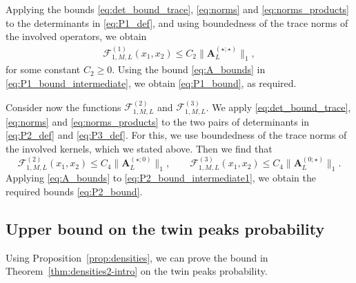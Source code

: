 \documentclass[oneside,final,11pt]{amsart}
\theoremstyle{definition}
\newcommand{\fh}{\mathfrak{h}}
\newcommand{\dens}{\CF}
\newcommand{\1}[1]{\mathbf{1}_{#1}}
\newcommand{\fx}{x}
\newcommand{\fM}{M}
\newcommand{\fA}{\mathbf{A}}
\newcommand{\CF}{\mathcal{F}}
\numberwithin{equation}{section}
\begin{document}
Applying the bounds \eqref{eq:det_bound_trace}, \eqref{eq:norms} and  \eqref{eq:norms_products} to the determinants in \eqref{eq:P1_def}, and using boundedness of the trace norms of the involved operators, we obtain
\begin{align}\label{eq:P1_bound_intermediate}
\dens^{(1)}_{1, \fM, L}(\fx_1, \fx_2) \leq C_2 \bigl\| \fA_L^{(\star; \star)} \bigr\|_1,
\end{align}
for some constant $C_2 \geq 0$. Using the bound \eqref{eq:A_bounds} in \eqref{eq:P1_bound_intermediate}, we obtain \eqref{eq:P1_bound}, as required. 

Consider now the functions $\dens^{(2)}_{1, \fM, L}$ and $\dens^{(3)}_{1, \fM, L}$.  We apply \eqref{eq:det_bound_trace}, \eqref{eq:norms} and \eqref{eq:norms_products} to the two pairs of determinants in \eqref{eq:P2_def} and \eqref{eq:P3_def}. For this, we use boundedness of the trace norms of the involved kernels, which we stated above. Then we find that
\begin{equation}\label{eq:P2_bound_intermediate1}
\dens^{(2)}_{1, \fM, L}(\fx_1, \fx_2) \leq C_4 \bigl\| \fA^{(\star; 0)}_L \bigr\|_1, \qquad \dens^{(3)}_{1, \fM, L}(\fx_1, \fx_2) \leq C_4 \bigl\| \fA^{(0; \star)}_L \bigr\|_1.
\end{equation}
Applying \eqref{eq:A_bounds} to \eqref{eq:P2_bound_intermediate1}, we obtain the required bounds \eqref{eq:P2_bound}.

\subsection{Upper bound on the twin peaks probability}\label{sec:uppbd}

Using Proposition~\ref{prop:densities}, we can prove the bound in Theorem~\ref{thm:densities2-intro} on the twin peaks probability. %
\end{document}
